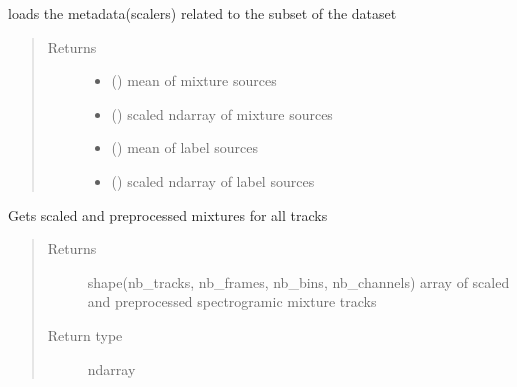 \documentclass[letterpaper,10pt,english,openany,oneside]{sphinxmanual}
\begin{document}
\begin{fulllineitems}
\begin{fulllineitems}
\end{fulllineitems}


\begin{fulllineitems}
\label{\detokenize{docs/source/dataset:dataset.Dataset.load_metadata}}
loads the metadata(scalers) related to the subset of the dataset
\begin{quote}\begin{description}
\item[{Returns}] \leavevmode
\begin{itemize}
\item {} 
 () \textendash{} mean of mixture sources

\item {} 
 () \textendash{} scaled ndarray of mixture sources

\item {} 
 () \textendash{} mean of label sources

\item {} 
 () \textendash{} scaled ndarray of label sources

\end{itemize}


\end{description}\end{quote}

\end{fulllineitems}


\begin{fulllineitems}
\label{\detokenize{docs/source/dataset:dataset.Dataset.mixtures}}
Gets scaled and preprocessed mixtures for all tracks
\begin{quote}\begin{description}
\item[{Returns}] \leavevmode
{} \textendash{} shape(nb\_tracks, nb\_frames, nb\_bins, nb\_channels)
array of scaled and preprocessed spectrogramic mixture tracks

\item[{Return type}] \leavevmode
ndarray

\end{description}\end{quote}

\end{fulllineitems}


\end{fulllineitems}
\end{document}
